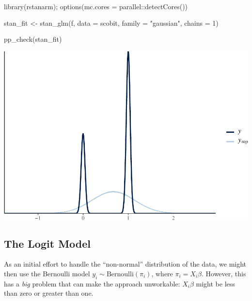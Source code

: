 \documentclass[
]{book}
\newenvironment{Shaded}{\begin{snugshade}}{\end{snugshade}}
\newcommand{\AttributeTok}[1]{\textcolor[rgb]{0.77,0.63,0.00}{#1}}
\newcommand{\DecValTok}[1]{\textcolor[rgb]{0.00,0.00,0.81}{#1}}
\newcommand{\FunctionTok}[1]{\textcolor[rgb]{0.00,0.00,0.00}{#1}}
\newcommand{\NormalTok}[1]{#1}
\newcommand{\OtherTok}[1]{\textcolor[rgb]{0.56,0.35,0.01}{#1}}
\newcommand{\SpecialCharTok}[1]{\textcolor[rgb]{0.00,0.00,0.00}{#1}}
\newcommand{\StringTok}[1]{\textcolor[rgb]{0.31,0.60,0.02}{#1}}
\begin{document}
\begin{Shaded}
\begin{Highlighting}[]
\FunctionTok{library}\NormalTok{(rstanarm); }\FunctionTok{options}\NormalTok{(}\AttributeTok{mc.cores =}\NormalTok{ parallel}\SpecialCharTok{::}\FunctionTok{detectCores}\NormalTok{())}

\NormalTok{stan\_fit }\OtherTok{\textless{}{-}} \FunctionTok{stan\_glm}\NormalTok{(f, }\AttributeTok{data =}\NormalTok{ scobit, }\AttributeTok{family =} \StringTok{"gaussian"}\NormalTok{, }\AttributeTok{chains =} \DecValTok{1}\NormalTok{)}
\end{Highlighting}
\end{Shaded}

\begin{Shaded}
\begin{Highlighting}[]
\FunctionTok{pp\_check}\NormalTok{(stan\_fit)}
\end{Highlighting}
\end{Shaded}

\includegraphics{03-02-bernoulli-model_files/figure-latex/unnamed-chunk-4-1.pdf}

\hypertarget{the-logit-model}{%
\subsection{The Logit Model}\label{the-logit-model}}

As an initial effort to handle the ``non-normal'' distribution of the data, we might then use the Bernoulli model \(y_i \sim \text{Bernoulli}(\pi_i)\), where \(\pi_i = X_i\beta\). However, this has a \emph{big} problem that can make the approach unworkable: \(X_i\beta\) might be less than zero or greater than one.
\end{document}

